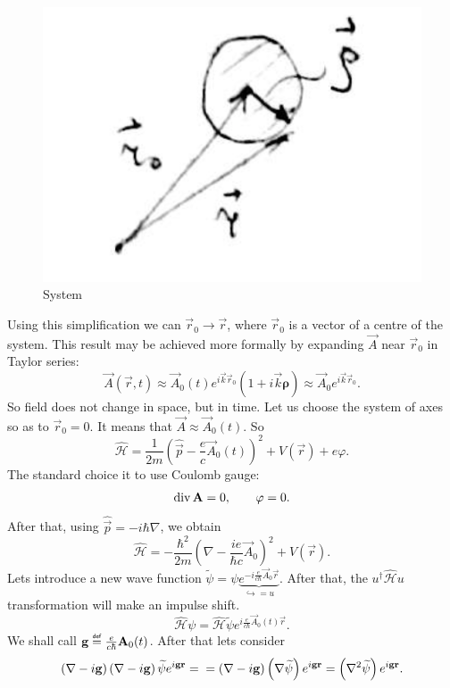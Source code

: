\begin{figure}[h!]
	\centering
	\includegraphics[width=0.3\linewidth]{fig/L4/simply}
	\caption{System}
	\label{fig:simply}
\end{figure}


Using this simplification we can $\vec{r}_0 \to \vec{r}$, where $\vec{r}_0$ is a vector of a centre of the system. This result may be achieved more formally by expanding $\vec{A}$ near $\vec{r}_0$ in Taylor series:
\begin{equation}
	\vec{A} (\vec{r},t) \approx \vec{A}_0 (t) e^{i \vec{k} \vec{r}_0} \left( 1 + i \vec{k} \bm{\rho} \right) \approx \vec{A}_0 e^{i \vec{k} \vec{r}_0}.
\end{equation} 
So field does not change in space, but in time. Let us choose the system of axes so as to $\vec{r}_0 = 0$. It means that $\vec{A} \approx \vec{A}_0 (t)$. So
\begin{equation}
	\hat{\mathscr{H}} = \frac{1}{2m} \left( \hat{\vec{p}}  - \frac{e}{c} \vec{A}_0(t) \right)^2 + V (\vec{r}) + e \varphi.
\end{equation}
The standard choice it to use Coulomb gauge:
\begin{equation}
	\Div \vec{A} = 0, \qquad \varphi = 0.
\end{equation}
After that, using $\hat{\vec{p}} = -i \hbar \nabla$, we obtain
\begin{equation}
	\hat{\mathscr{H}} = - \frac{\hbar^2}{2m} \left( \nabla - \frac{i e}{\hbar c} \vec{A}_0  \right)^2 + V(\vec{r}).
\end{equation}
Lets introduce a new wave function $\widetilde{\psi} = \psi \underbrace{e^{- i \frac{e}{c \hbar} \vec{A}_0 \vec{r}}}_{\hookrightarrow = u}$. After that, the $ u^{\dagger} \hat{\mathscr{H}} u $ transformation will make an impulse shift.
\begin{equation}
	\hat{\mathscr{H}} \psi = \hat{\mathscr{H}} \widetilde{\psi} e^{i \frac{e}{c \hbar} \vec{A}_0 (t) \vec{r}}.
\end{equation}
We shall call $\vec{g} \myeq \frac{e}{c \hbar} \vec{A}_0 (t)$. After that lets consider
\begin{equation}
	\left( \nabla - i \vec{g} \right) \left( \nabla - i \vec{g} \right) \widetilde{\psi} e^{i \vec{g} \vec{r}} = \\ = \left( \nabla - i \vec{g} \right) \left( \nabla \widetilde{\psi}  \right) e^{i \vec{g} \vec{r}} = \left( \nabla^2 \widetilde{\psi} \right) e^{i \vec{g} \vec{r}}.
\end{equation}

